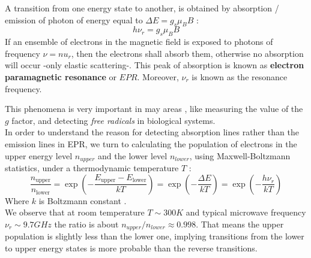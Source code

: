 A transition from one energy state to another, is obtained by absorption / emission of photon of energy equal to $ \Delta E = g_s \mu_B B$ :
\begin{equation}
h \nu_r = g_s \mu_B B
\end{equation}
If an ensemble of electrons in the magnetic field is exposed to photons of frequency $ \nu= nu_r$, then the electrons shall absorb them, otherwise no absorption will occur -only elastic scattering-. This peak of absorption is known as\textbf{ electron paramagnetic resonance} or $EPR$. Moreover, $ \nu_r$ is known as the resonance frequency. 

This phenomena is very important in may areas , like measuring the value of the $ g$ factor, and detecting \textit{free radicals} in biological systems.\\
In order to understand the reason for detecting absorption lines rather than the emission lines in EPR, we turn to calculating the population of electrons in the upper energy level $ n_{upper}$ and the lower level $ n_{lower}$, using Maxwell-Boltzmann statistics, under a thermodynamic temperature $T$ :
\begin{equation}
\frac{ n_\text{upper} }{ n_\text{lower} } = \exp{ \left( -\frac{ E_\text{upper}-E_\text{lower} }{ kT } \right) } = \exp{ \left( -\frac{ \Delta E }{ kT }  \right) } = \exp{ \left( -\frac{ h\nu_r }{ kT }\right) }
\end{equation}
Where $k$ is Boltzmann constant .\\
We observe that at room temperature $ T \sim 300 K$ and typical microwave frequency  $ \nu_r \sim 9.7 GHz$ the ratio is about $ n_{upper}/n_{lower} \approx0.998$. That means the upper population is slightly less than the lower one, implying transitions from the lower to upper energy states is more probable than the reverse transitions. 

